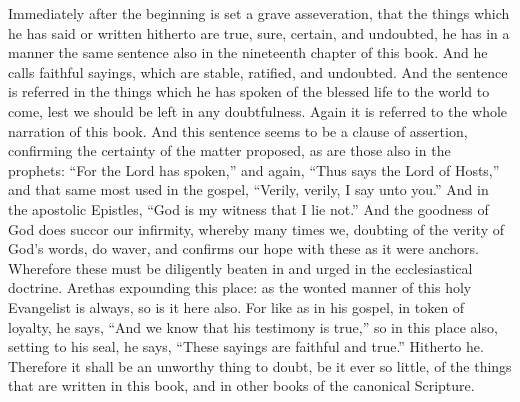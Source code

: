 Immediately after the beginning is set a grave asseveration, that the things which he has said or written hitherto are true, sure, certain, and undoubted, he has in a manner the same sentence also in the nineteenth chapter of this book. And he calls faithful sayings, which are stable, ratified, and undoubted. And the sentence is referred in the things which he has spoken of the blessed life to the world to come, lest we should be left in any doubtfulness. Again it is referred to the whole narration of this book. And this sentence seems to be a clause of assertion, confirming the certainty of the matter proposed, as are those also in the prophets: “For the Lord has spoken,” and again, “Thus says the Lord of Hosts,” and that same most used in the gospel, “Verily, verily, I say unto you.” And in the apostolic Epistles, “God is my witness that I lie not.” And the goodness of God does succor our infirmity, whereby many times we, doubting of the verity of God’s words, do waver, and confirms our hope with these as it were anchors. Wherefore these must be diligently beaten in and urged in the ecclesiastical doctrine. Arethas expounding this place: as the wonted manner of this holy Evangelist is always, so is it here also. For like as in his gospel, in token of loyalty, he says, “And we know that his testimony is true,” so in this place also, setting to his seal, he says, “These sayings are faithful and true.” Hitherto he. Therefore it shall be an unworthy thing to doubt, be it ever so little, of the things that are written in this book, and in other books of the canonical Scripture.

